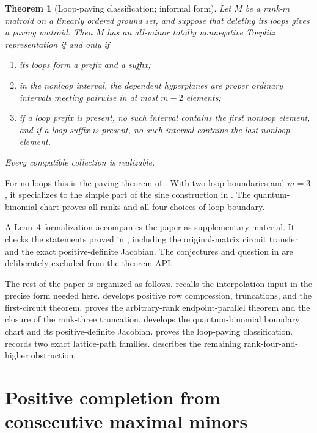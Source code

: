 \documentclass[11pt]{amsart}
\newtheorem{theorem}{Theorem}[section]
\theoremstyle{definition}
\theoremstyle{remark}
\begin{document}
\begin{theorem}[Loop-paving classification; informal form]\label{thm:intro-loop-paving}
Let $M$ be a rank-$m$ matroid on a linearly ordered ground set, and suppose that deleting its loops gives a paving matroid.  Then $M$ has an all-minor totally nonnegative Toeplitz representation if and only if
\begin{enumerate}
\item its loops form a prefix and a suffix;
\item in the nonloop interval, the dependent hyperplanes are proper ordinary intervals meeting pairwise in at most $m-2$ elements;
\item if a loop prefix is present, no such interval contains the first nonloop element, and if a loop suffix is present, no such interval contains the last nonloop element.
\end{enumerate}
Every compatible collection is realizable.
\end{theorem}

For no loops this is the paving theorem of \cite{CGQpaving}.  With two loop boundaries and $m=3$, it specializes to the simple part of the sine construction in \cite{CGQlow}.  The quantum-binomial chart proves all ranks and all four choices of loop boundary.

A Lean~4 formalization accompanies the paper as supplementary material.  It checks the statements proved in , including the original-matrix circuit transfer and the exact positive-definite Jacobian.  The conjectures and question in  are deliberately excluded from the theorem API.

The rest of the paper is organized as follows.   recalls the interpolation input in the precise form needed here.   develops positive row compression, truncations, and the first-circuit theorem.   proves the arbitrary-rank endpoint-parallel theorem and the closure of the rank-three truncation.   develops the quantum-binomial boundary chart and its positive-definite Jacobian.   proves the loop-paving classification.   records two exact lattice-path families.   describes the remaining rank-four-and-higher obstruction.

\section{Positive completion from consecutive maximal minors}\label{sec:completion}
\end{document}
